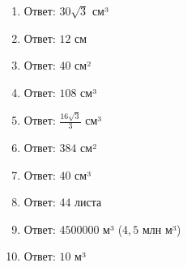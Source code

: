 \documentclass{umk-matematika}
\begin{document}
\begin{enumerate}
  \item Ответ: $30\sqrt{3}$ см³
  \item Ответ: $12$ см
  \item Ответ: $40$ см²
  \item Ответ: $108$ см³
  \item Ответ: $\frac{16\sqrt{3}}{3}$ см³
  \item Ответ: $384$ см²
  \item Ответ: $40$ см³
  \item Ответ: $44$ листа
  \item Ответ: $4500000$ м³ ($4{,}5$ млн м³)
  \item Ответ: $10$ м³
\end{enumerate}
\end{document}
